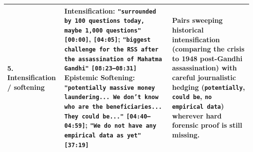 \documentclass[10pt,a4paper]{article}
\begin{document}
\begin{longtable}{@{}>{\raggedright\arraybackslash}p{} >{\raggedright\arraybackslash}p{} >{\raggedright\arraybackslash}p{}@{}}
\addlinespace[4pt]
\textbf{5. Intensification / softening} & \textbf{Intensification:} \texttt{"surrounded by 100 questions today, maybe 1,000 questions"} \texttt{[00:00]}, \texttt{[04:05]}; \texttt{"biggest challenge for the RSS after the assassination of Mahatma Gandhi"} \texttt{[08:23--08:31]} \newline  \textbf{Epistemic Softening:} \texttt{"potentially massive money laundering... We don't know who are the beneficiaries... They could be..."} \texttt{[04:40--04:59]}; \texttt{"We do not have any empirical data as yet"} \texttt{[37:19]} & Pairs sweeping historical intensification (comparing the crisis to 1948 post-Gandhi assassination) with careful journalistic hedging (\texttt{potentially}, \texttt{could be}, \texttt{no empirical data}) wherever hard forensic proof is still missing. \\
\bottomrule
\end{longtable}
\end{document}
